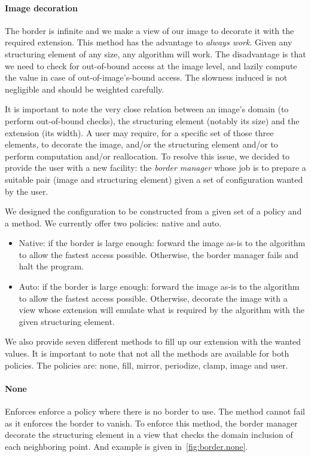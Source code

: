 \paragraph{Image decoration}
The border is infinite and we make a view of our image to decorate it with the required extension. This method has the
advantage to \textit{always work}. Given any structuring element of any size, any algorithm will work. The disadvantage
is that we need to check for out-of-bound access at the image level, and lazily compute the value in case of
out-of-image's-bound access. The slowness induced is not negligible and should be weighted carefully.

\bigskip

It is important to note the very close relation between an image's domain (to perform out-of-bound checks), the
structuring element (notably its size) and the extension (its width). A user may require, for a specific set of those
three elements, to decorate the image, and/or the structuring element and/or to perform computation and/or reallocation.
To resolve this issue, we decided to provide the user with a new facility: the \textit{border manager} whose job is to
prepare a suitable pair (image and structuring element) given a set of configuration wanted by the user.

We designed the configuration to be constructed from a given set of a policy and a method. We currently offer two
policies: native and auto.

\begin{itemize}
  \item Native: if the border is large enough: forward the image as-is to the algorithm to allow the fastest access
        possible. Otherwise, the border manager fails and halt the program.
  \item Auto: if the border is large enough: forward the image as-is to the algorithm to allow the fastest access
        possible. Otherwise, decorate the image with a view whose extension will emulate what is required by the
        algorithm with the given structuring element.
\end{itemize}

We also provide seven different methods to fill up our extension with the wanted values. It is important to note that
not all the methods are available for both policies. The policies are: none, fill, mirror, periodize, clamp, image and
user.

\paragraph{None} Enforces enforce a policy where there is no border to use. The method cannot fail as it enforces the
border to vanish. To enforce this method, the border manager decorate the structuring element in a view that checks the
domain inclusion of each neighboring point. And example is given in~\cref{fig:border.none}.

